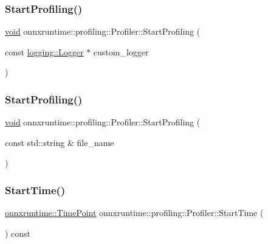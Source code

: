 \subsubsection{\texorpdfstring{Start\+Profiling()}{StartProfiling()}\hspace{0.1cm}{\footnotesize\ttfamily [1/2]}}
{\footnotesize\ttfamily \mbox{\hyperlink{mlasi_8h_a88f941d423cb2a819b70a1358982b1a6}{void}} onnxruntime\+::profiling\+::\+Profiler\+::\+Start\+Profiling (\begin{DoxyParamCaption}\item[{const \mbox{\hyperlink{classonnxruntime_1_1logging_1_1Logger}{logging\+::\+Logger}} $\ast$}]{custom\+\_\+logger }\end{DoxyParamCaption})}

\mbox{\label{classonnxruntime_1_1profiling_1_1Profiler_a9570fec28a8e43eb2937ba6383185661}} 
\subsubsection{\texorpdfstring{Start\+Profiling()}{StartProfiling()}\hspace{0.1cm}{\footnotesize\ttfamily [2/2]}}
{\footnotesize\ttfamily \mbox{\hyperlink{mlasi_8h_a88f941d423cb2a819b70a1358982b1a6}{void}} onnxruntime\+::profiling\+::\+Profiler\+::\+Start\+Profiling (\begin{DoxyParamCaption}\item[{const std\+::string \&}]{file\+\_\+name }\end{DoxyParamCaption})}

\mbox{\label{classonnxruntime_1_1profiling_1_1Profiler_a273e1d74c3db999223080120ea89705d}} 
\subsubsection{\texorpdfstring{Start\+Time()}{StartTime()}}
{\footnotesize\ttfamily \mbox{\hyperlink{namespaceonnxruntime_a9b5a17a572f7c3cf77f4892542bd7153}{onnxruntime\+::\+Time\+Point}} onnxruntime\+::profiling\+::\+Profiler\+::\+Start\+Time (\begin{DoxyParamCaption}{ }\end{DoxyParamCaption}) const}



